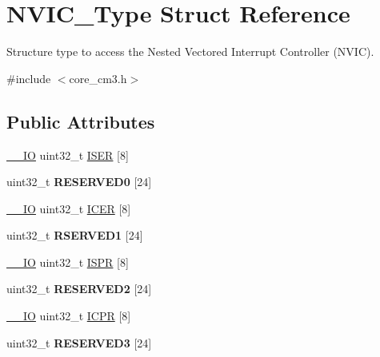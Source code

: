 \hypertarget{struct_n_v_i_c___type}{\section{\-N\-V\-I\-C\-\_\-\-Type \-Struct \-Reference}
\label{struct_n_v_i_c___type}
}


\-Structure type to access the \-Nested \-Vectored \-Interrupt \-Controller (\-N\-V\-I\-C).  




{\ttfamily \#include $<$core\-\_\-cm3.\-h$>$}

\subsection*{\-Public \-Attributes}
\begin{DoxyCompactItemize}
\item 
\hyperlink{group___c_m_s_i_s__core__definitions_gaec43007d9998a0a0e01faede4133d6be}{\-\_\-\-\_\-\-I\-O} uint32\-\_\-t \hyperlink{struct_n_v_i_c___type_af90c80b7c2b48e248780b3781e0df80f}{\-I\-S\-E\-R} \mbox{[}8\mbox{]}
\item 
\hypertarget{struct_n_v_i_c___type_a2de17698945ea49abd58a2d45bdc9c80}{uint32\-\_\-t {\bfseries \-R\-E\-S\-E\-R\-V\-E\-D0} \mbox{[}24\mbox{]}}\label{struct_n_v_i_c___type_a2de17698945ea49abd58a2d45bdc9c80}

\item 
\hyperlink{group___c_m_s_i_s__core__definitions_gaec43007d9998a0a0e01faede4133d6be}{\-\_\-\-\_\-\-I\-O} uint32\-\_\-t \hyperlink{struct_n_v_i_c___type_a1965a2e68b61d2e2009621f6949211a5}{\-I\-C\-E\-R} \mbox{[}8\mbox{]}
\item 
\hypertarget{struct_n_v_i_c___type_a6d1daf7ab6f2ba83f57ff67ae6f571fe}{uint32\-\_\-t {\bfseries \-R\-S\-E\-R\-V\-E\-D1} \mbox{[}24\mbox{]}}\label{struct_n_v_i_c___type_a6d1daf7ab6f2ba83f57ff67ae6f571fe}

\item 
\hyperlink{group___c_m_s_i_s__core__definitions_gaec43007d9998a0a0e01faede4133d6be}{\-\_\-\-\_\-\-I\-O} uint32\-\_\-t \hyperlink{struct_n_v_i_c___type_acf8e38fc2e97316242ddeb7ea959ab90}{\-I\-S\-P\-R} \mbox{[}8\mbox{]}
\item 
\hypertarget{struct_n_v_i_c___type_a0953af43af8ec7fd5869a1d826ce5b72}{uint32\-\_\-t {\bfseries \-R\-E\-S\-E\-R\-V\-E\-D2} \mbox{[}24\mbox{]}}\label{struct_n_v_i_c___type_a0953af43af8ec7fd5869a1d826ce5b72}

\item 
\hyperlink{group___c_m_s_i_s__core__definitions_gaec43007d9998a0a0e01faede4133d6be}{\-\_\-\-\_\-\-I\-O} uint32\-\_\-t \hyperlink{struct_n_v_i_c___type_a46241be64208436d35c9a4f8552575c5}{\-I\-C\-P\-R} \mbox{[}8\mbox{]}
\item 
\hypertarget{struct_n_v_i_c___type_a9dd330835dbf21471e7b5be8692d77ab}{uint32\-\_\-t {\bfseries \-R\-E\-S\-E\-R\-V\-E\-D3} \mbox{[}24\mbox{]}}\label{struct_n_v_i_c___type_a9dd330835dbf21471e7b5be8692d77ab}


\end{DoxyCompactItemize}
